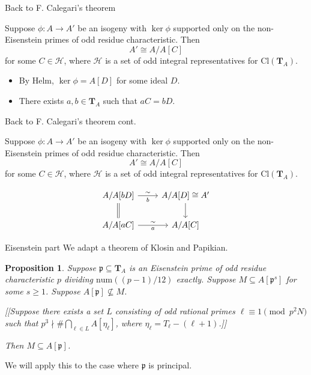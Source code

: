 \documentclass{beamer}
\newtheorem{proposition}[theorem]{Proposition}
\newcommand{\TT}{\mathbf{T}}
\renewcommand{\H}{\mathcal{H}}
\newcommand{\num}{\mathrm{num}}
\newcommand{\Cl}{\mathrm{Cl}}
\newcommand{\p}{\mathfrak{p}}
\begin{document}
\begin{frame}{Back to F. Calegari's theorem}
    \begin{theorem}[F. Calegari]
        Suppose $\phi:A\to A'$ be an isogeny with $\ker\phi$ supported only on the
        non-Eisenstein primes of odd residue characteristic. Then
        \[
            A'\cong A/A[C]
        \]
        for some $C\in \H$, where $\H$ is a set of odd integral representatives
        for $\Cl(\TT_A)$.
    \end{theorem}
    \begin{itemize}
        \item
            By Helm, $\ker\phi=A[D]$ for some ideal $D$.
        \item
            There exists $a,b\in \TT_A$ such that $aC=bD$.
    \end{itemize}
\end{frame}

\begin{frame}[fragile]{Back to F. Calegari's theorem cont.}
    \begin{theorem}[F. Calegari]
        Suppose $\phi:A\to A'$ be an isogeny with $\ker\phi$ supported only on the
        non-Eisenstein primes of odd residue characteristic. Then
        \[
            A'\cong A/A[C]
        \]
        for some $C\in \H$, where $\H$ is a set of odd integral representatives
        for $\Cl(\TT_A)$.
    \end{theorem}
    \[
        \begin{tikzcd}
            A/A[bD]
            \arrow[r, "\sim", "b"']
            \ar[equal]{d}
            &
            A/A[D]\cong A'
            \ar[d]
            \\
            A/A[a C]
            \arrow[r, "\sim", "a"']
            &
            A/A[C]
        \end{tikzcd}
    \]
\end{frame}

\begin{frame}{Eisenstein part}
    We adapt a theorem of Klosin and Papikian. 

    \begin{proposition}
        Suppose $\p\subseteq \TT_A$ is an Eisenstein prime of odd residue
        characteristic $p$ dividing $\num((p-1)/12)$ exactly. Suppose
        $M\subseteq A[\p^s]$ for some $s\geq 1$. Suppose $A[\p]\not\subseteq
        M$. 

        [[Suppose there exists a set $L$ consisting of odd rational primes
        $\ell\equiv 1 \pmod{p^2 N}$ such that $p^3\nmid \#\bigcap_{\ell\in L}
        A[\eta_\ell]$, where $\eta_\ell=T_\ell-(\ell+1)$.]]

        Then $M\subseteq A[\p]$.
    \end{proposition}
    We will apply this to the case where $\p$ is principal.
\end{frame}
\end{document}
